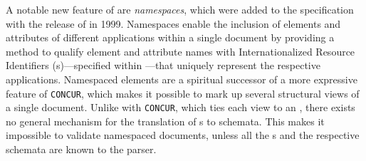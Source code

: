 \documentclass{book}
\begin{document}
        A notable new feature of  are \emph{namespaces}, which
        were added to the specification with the release of \cite{bray99} in
        1999. Namespaces enable the inclusion of elements and attributes of
        different  applications within a single 
        document by providing a method to qualify element and attribute names
        with Internationalized Resource Identifiers (s)---specified
        within \cite{rfc3987}---that uniquely represent the respective
         applications. Namespaced elements are a spiritual
        successor of a more expressive  feature of
        \texttt{CONCUR}, which makes it possible to mark up several structural
        views of a single document. Unlike with \texttt{CONCUR}, which ties each
        view to an  , there exists no general
        mechanism for the translation of s to 
        schemata. This makes it impossible to validate namespaced 
        documents, unless all the s and the respective schemata are
        known to the parser.

\end{document}
